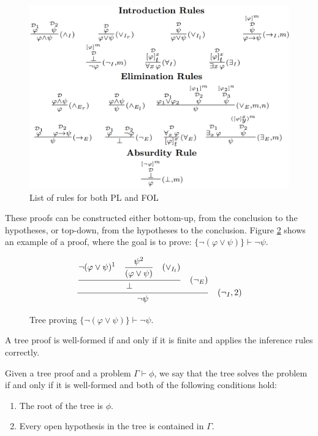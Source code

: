 \begin{figure}
    \centering
    \includegraphics[width=1\linewidth]{resources/rules.png}
    \caption{List of rules for both PL and FOL}
    \label{fig:nd-rules}
\end{figure}

These proofs can be constructed either bottom-up, from the conclusion to the hypotheses, or top-down, from the hypotheses to the conclusion. Figure \ref{tab:proof-tree} shows an example of a proof, where the goal is to prove: \( \{\neg (\varphi \lor \psi)\} \vdash \neg \psi \).

\begin{figure}
    \centering
    \[
    \frac{\displaystyle \frac{
    \displaystyle \neg (\varphi \lor \psi)^1 \quad \displaystyle \frac{\psi^2}{(\varphi \lor \psi) \strut} \quad (\lor_{I_l}) \strut}
    {\displaystyle \bot \strut} \quad (\displaystyle \neg_E)\strut} {\displaystyle \neg \psi \strut} \quad (\neg_I, 2)
    \]
    \caption{Tree proving \( \{\neg (\varphi \lor \psi)\} \vdash \neg \psi \).}
    \label{tab:proof-tree}
\end{figure}


\begin{definition}
A tree proof is well-formed if and only if it is finite and applies the inference rules correctly.
\end{definition}

\begin{definition}
Given a tree proof and a problem \(\Gamma \vdash \phi\), we say that the tree solves the problem if and only if it is well-formed and both of the following conditions hold:
\begin{enumerate}
    \item The root of the tree is \(\phi\).
    \item Every open hypothesis in the tree is contained in \(\Gamma\).
\end{enumerate}
\end{definition}